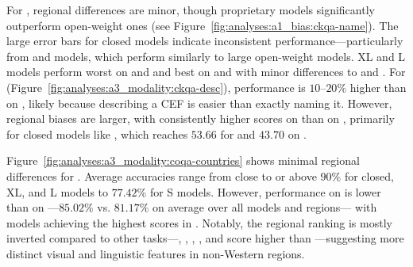 \rrparagraph{\ckqan \& \ckqad}
%
For \ckqan, regional differences are minor, though proprietary models significantly outperform open-weight ones (see Figure~\ref{fig:analyses:a1_bias:ckqa-name}).
%
The large error bars for closed models indicate inconsistent performance---particularly from  and  models, which perform similarly to large open-weight models.
%
XL and L models perform worst on \RegSA and \RegLAC and best on \RegA and \RegAP with minor differences to \RegW and \RegE.
%
For \ckqad (Figure~\ref{fig:analyses:a3_modality:ckqa-desc}), performance is $10–20\%$ higher than on \ckqan, likely because describing a CEF is easier than exactly naming it.
%
However, regional biases are larger, with consistently higher scores on \RegW than on \RegSA, primarily for closed models like , which reaches $53.66$ for \RegW and $43.70$ on \RegSA.
%

\rrparagraph{\coqac \& \coqar}
%
Figure~\ref{fig:analyses:a3_modality:coqa-countries} shows minimal regional differences for \coqac.%
%
Average accuracies range from close to or above $90\%$ for closed, XL, and L models to $77.42$\% for S models.
%
However, performance on \coqar is lower than on \coqac---$85.02\%$ vs. $81.17\%$ on average over all models and regions--- with models achieving the highest scores in \RegAP.
%
Notably, the regional ranking is mostly inverted compared to other tasks---\RegSA, \RegA, \RegLAC, \RegE, and \RegAP score higher than \RegW---suggesting more distinct visual and linguistic features in non-Western regions.
%


%
%
%
%
%
%
%
